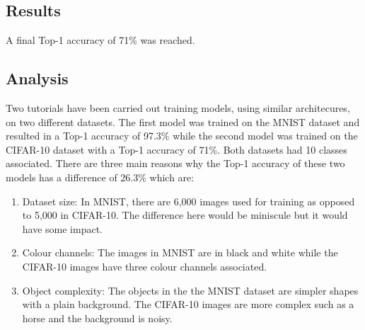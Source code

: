 \tocless\subsection{Results}
A final Top-1 accuracy of 71\% was reached.

\tocless\subsection{Analysis}
Two tutorials have been carried out training models, using similar architecures, on two different datasets.
The first model was trained on the MNIST dataset and resulted in a Top-1 accuracy of 97.3\% while the second model was trained on the CIFAR-10 dataset with a Top-1 accuracy of 71\%.
Both datasets had 10 classes associated.
There are three main reasons why the Top-1 accuracy of these two models has a difference of 26.3\% which are:
\begin{enumerate}
    \item{Dataset size: In MNIST, there are 6,000 images used for training as opposed to 5,000 in CIFAR-10. The difference here would be miniscule but it would have some impact.}
    \item{Colour channels: The images in MNIST are in black and white while the CIFAR-10 images have three colour channels associated.}
    \item{Object complexity: The objects in the the MNIST dataset are simpler shapes with a plain background. The CIFAR-10 images are more complex such as a horse and the background is noisy.}
\end{enumerate}

\clearpage
